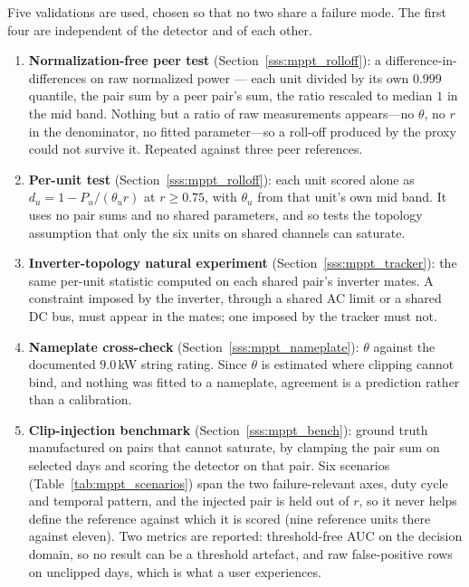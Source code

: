 Five validations are used, chosen so that no two share a failure mode. The first four are independent of the detector and of each other.

\begin{enumerate}
  \item \textbf{Normalization-free peer test} (Section~\ref{sss:mppt_rolloff}): a difference-in-differences on raw normalized power --- each unit divided by its own $0.999$ quantile, the pair sum by a peer pair's sum, the ratio rescaled to median $1$ in the mid band. Nothing but a ratio of raw measurements appears---no $\theta$, no $r$ in the denominator, no fitted parameter---so a roll-off produced by the proxy could not survive it. Repeated against three peer references.
  \item \textbf{Per-unit test} (Section~\ref{sss:mppt_rolloff}): each unit scored alone as $d_u = 1 - P_u/(\theta_u r)$ at $r \ge 0.75$, with $\theta_u$ from that unit's own mid band. It uses no pair sums and no shared parameters, and so tests the topology assumption that only the six units on shared channels can saturate.
  \item \textbf{Inverter-topology natural experiment} (Section~\ref{sss:mppt_tracker}): the same per-unit statistic computed on each shared pair's inverter mates. A constraint imposed by the inverter, through a shared AC limit or a shared DC bus, must appear in the mates; one imposed by the tracker must not.
  \item \textbf{Nameplate cross-check} (Section~\ref{sss:mppt_nameplate}): $\theta$ against the documented $9.0$\,kW string rating. Since $\theta$ is estimated where clipping cannot bind, and nothing was fitted to a nameplate, agreement is a prediction rather than a calibration.
  \item \textbf{Clip-injection benchmark} (Section~\ref{sss:mppt_bench}): ground truth manufactured on pairs that cannot saturate, by clamping the pair sum on selected days and scoring the detector on that pair. Six scenarios (Table~\ref{tab:mppt_scenarios}) span the two failure-relevant axes, duty cycle and temporal pattern, and the injected pair is held out of $r$, so it never helps define the reference against which it is scored (nine reference units there against eleven). Two metrics are reported: threshold-free AUC on the decision domain, so no result can be a threshold artefact, and raw false-positive rows on unclipped days, which is what a user experiences.
\end{enumerate}

